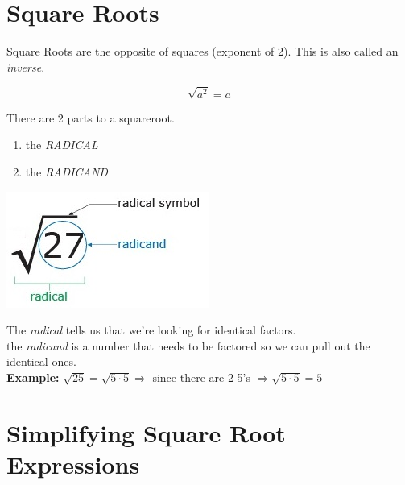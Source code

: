 \documentclass[12pt]{article}
\begin{document}
\pagebreak

\section{Square Roots}

Square Roots are the opposite of squares (exponent of 2). This is also called an \textit{inverse}.\\

\begin{LARGE}
	$$\sqrt{a^2}=a$$
\end{LARGE}



\hrulefill

There are 2 parts to a squareroot.

\begin{enumerate}

	\item the \textit{RADICAL}\\
	
	\item the \textit{RADICAND}\\
	
\end{enumerate}

\begin{center}
\includegraphics[scale=.7]{squareroot.jpg}
\end{center}


The \textit{radical} tells us that we're looking for identical factors.\\

the \textit{radicand} is a number that needs to be factored so we can pull out the identical ones.\\

\textbf{Example:} $\sqrt{25}=\sqrt{5\cdot5} \Longrightarrow$ since there are 2 5's $\Longrightarrow \sqrt{5\cdot5}=5$\\

\pagebreak

\section{Simplifying Square Root Expressions}
\end{document}
